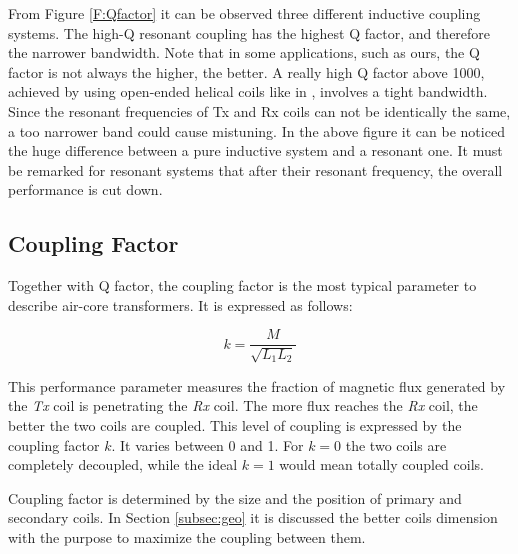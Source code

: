 From Figure \ref{F:Qfactor} it can be observed three different inductive coupling systems. The high-Q resonant coupling has the highest Q factor, and therefore the narrower bandwidth. Note that in some applications, such as ours, the Q factor is not always the higher, the better. A really high Q factor above 1000, achieved by using open-ended helical coils like in \cite{Karalis200834}, involves a tight bandwidth. Since the resonant frequencies of Tx and Rx coils can not be identically the same, a too narrower band could cause mistuning. In the above figure it can be noticed the huge difference between a pure inductive system and a resonant one. It must be remarked for resonant systems that after their resonant frequency, the overall performance is cut down.


















		\subsection{Coupling Factor}
Together with Q factor, the coupling factor is the most typical parameter to describe air-core transformers. It is expressed as follows:

\begin{equation}
	k = \frac{M}{\sqrt{L_1L_2}}
\end{equation}

This performance parameter measures the fraction of magnetic flux generated by the \textit{Tx} coil is penetrating the \textit{Rx} coil. The more flux reaches the \textit{Rx} coil, the better the two coils are coupled. This level of coupling is expressed by the coupling factor $k$. It varies between 0 and 1. For $k=0$ the two coils are completely decoupled, while the ideal $k=1$ would mean totally coupled coils.

Coupling factor is determined by the size and the position of primary and secondary coils. In Section \ref{subsec:geo} it is discussed the better coils dimension with the purpose to maximize the coupling between them.













